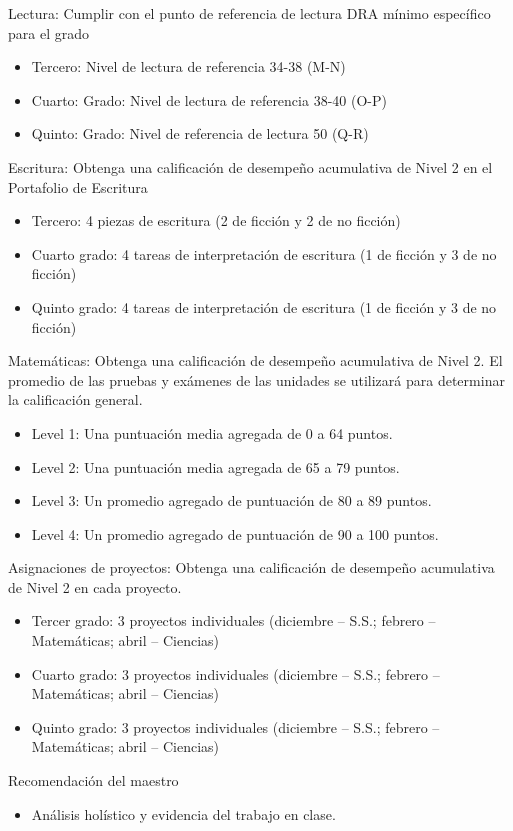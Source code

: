 \documentclass[12pt,letterpaper]{article}
\begin{document}
Lectura: Cumplir con el punto de referencia de lectura DRA mínimo específico para el grado
\begin{itemize}
\item Tercero: Nivel de lectura de referencia 34-38 (M-N)
\item Cuarto: Grado: Nivel de lectura de referencia 38-40 (O-P)
\item Quinto: Grado: Nivel de referencia de lectura 50 (Q-R)
\end{itemize}
\pagebreak
\vspace*{1.5cm}
Escritura: Obtenga una calificación de desempeño acumulativa de Nivel 2 en el Portafolio de Escritura
\begin{itemize}
\item Tercero: 4 piezas de escritura (2 de ficción y 2 de no ficción)
\item Cuarto grado: 4 tareas de interpretación de escritura (1 de ficción y 3 de no ficción)
\item Quinto grado: 4 tareas de interpretación de escritura (1 de ficción y 3 de no ficción)
\end{itemize}

Matemáticas: Obtenga una calificación de desempeño acumulativa de Nivel 2. El promedio de las pruebas y exámenes de las unidades se utilizará para determinar la calificación general.
\begin{itemize}
\item Level 1: Una puntuación media agregada de 0 a 64 puntos.
\item Level 2: Una puntuación media agregada de 65 a 79 puntos.
\item Level 3: Un promedio agregado de puntuación de 80 a 89 puntos.
\item Level 4: Un promedio agregado de puntuación de 90 a 100 puntos.
\end{itemize}

Asignaciones de proyectos: Obtenga una calificación de desempeño acumulativa de Nivel 2 en cada proyecto.
\begin{itemize}
\item Tercer grado: 3 proyectos individuales (diciembre – S.S.; febrero – Matemáticas; abril – Ciencias)
\item Cuarto grado: 3 proyectos individuales (diciembre – S.S.; febrero – Matemáticas; abril – Ciencias)
\item Quinto grado: 3 proyectos individuales (diciembre – S.S.; febrero – Matemáticas; abril – Ciencias)
\end{itemize}
Recomendación del maestro
\begin{itemize}
\item Análisis holístico y evidencia del trabajo en clase.
\end{itemize}
\end{document}
